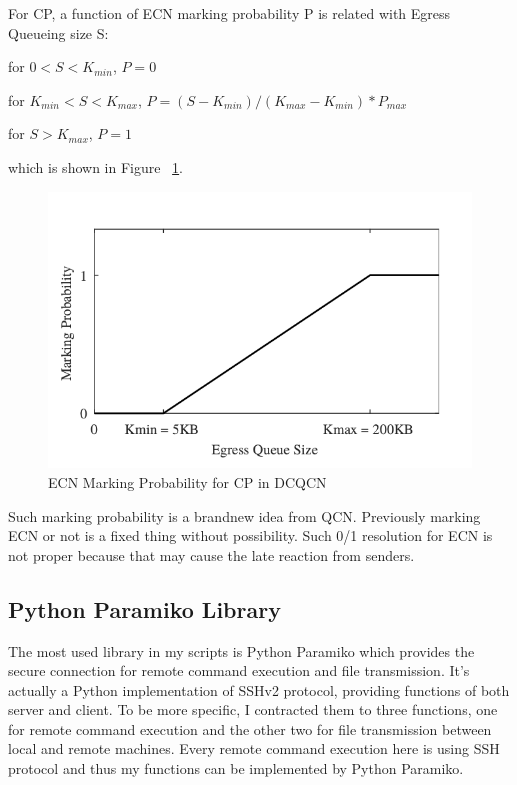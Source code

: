 \documentclass[12pt,a4paper]{article}
\begin{document}
For CP, a function of ECN marking probability P is related with Egress Queueing size S:

for $0<S<K_{min}$, $P = 0$

for $K_{min}<S<K_{max}$, $P = (S - K_{min})/(K_{max} - K_{min})*P_{max}$

for $S>K_{max}$, $P = 1$

which is shown in Figure ~\ref{fig:ECNMarking}.

\begin{figure}[h!]
	\begin{center}
		\includegraphics[width=5in]{ECNMarking}
		\caption{ECN Marking Probability for CP in DCQCN}
		\label{fig:ECNMarking}
	\end{center}
\end{figure}

Such marking probability is a brandnew idea from QCN.
Previously marking ECN or not is a fixed thing without possibility.
Such 0/1 resolution for ECN is not proper because that may cause the late reaction from senders.

\subsection{Python Paramiko Library}

The most used library in my scripts is Python Paramiko
which provides the secure connection for remote command execution and file transmission.
It's actually a Python implementation of SSHv2 protocol, providing functions of both server and client.
To be more specific, I contracted them to three functions,
one for remote command execution and the other two for file transmission between local and remote machines.
Every remote command execution here is using SSH protocol and thus my functions can be implemented by Python Paramiko.
\end{document}
